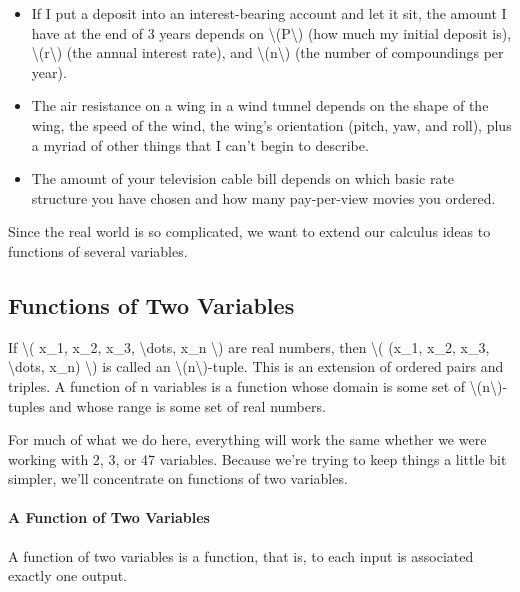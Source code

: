 \begin{itemize}
\tightlist
\item
  If I put a deposit into an interest-bearing account and let it sit,
  the amount I have at the end of 3 years depends on
  \textbackslash{}(P\textbackslash{}) (how much my initial deposit is),
  \textbackslash{}(r\textbackslash{}) (the annual interest rate), and
  \textbackslash{}(n\textbackslash{}) (the number of compoundings per
  year).
\item
  The air resistance on a wing in a wind tunnel depends on the shape of
  the wing, the speed of the wind, the wing's orientation (pitch, yaw,
  and roll), plus a myriad of other things that I can't begin to
  describe.
\item
  The amount of your television cable bill depends on which basic rate
  structure you have chosen and how many pay-per-view movies you
  ordered.
\end{itemize}

Since the real world is so complicated, we want to extend our calculus
ideas to functions of several variables.

\hypertarget{functions-of-two-variables}{%
\subsection{Functions of Two
Variables}\label{functions-of-two-variables}}

If \textbackslash{}( x\_1, x\_2, x\_3, \textbackslash{}dots, x\_n
\textbackslash{}) are real numbers, then \textbackslash{}( (x\_1, x\_2,
x\_3, \textbackslash{}dots, x\_n) \textbackslash{}) is called an
\textbackslash{}(n\textbackslash{})-tuple. This is an extension of
ordered pairs and triples. A function of n variables is a function whose
domain is some set of \textbackslash{}(n\textbackslash{})-tuples and
whose range is some set of real numbers.

For much of what we do here, everything will work the same whether we
were working with 2, 3, or 47 variables. Because we're trying to keep
things a little bit simpler, we'll concentrate on functions of two
variables.

\hypertarget{a-function-of-two-variables}{%
\paragraph{A Function of Two
Variables}\label{a-function-of-two-variables}}

A function of two variables is a function, that is, to each input is
associated exactly one output.

